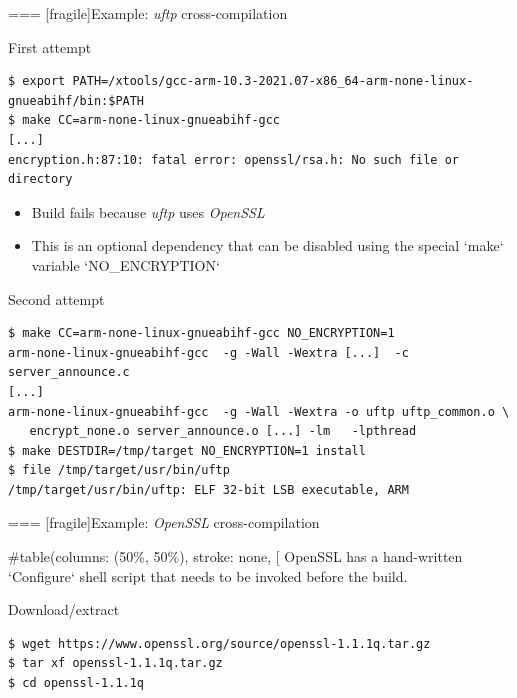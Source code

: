 === [fragile]{Example: {\em uftp} cross-compilation}
  \begin{block}{First attempt}
    {\scriptsize
\begin{verbatim}
$ export PATH=/xtools/gcc-arm-10.3-2021.07-x86_64-arm-none-linux-gnueabihf/bin:$PATH
$ make CC=arm-none-linux-gnueabihf-gcc
[...]
encryption.h:87:10: fatal error: openssl/rsa.h: No such file or directory
\end{verbatim}
    }
  \end{block}

  \begin{itemize}
  \item Build fails because {\em uftp} uses {\em OpenSSL}
  \item This is an optional dependency that can be disabled using the
    special `make` variable `NO_ENCRYPTION`
  \end{itemize}

  \begin{block}{Second attempt}
    {\scriptsize
\begin{verbatim}
$ make CC=arm-none-linux-gnueabihf-gcc NO_ENCRYPTION=1
arm-none-linux-gnueabihf-gcc  -g -Wall -Wextra [...]  -c server_announce.c
[...]
arm-none-linux-gnueabihf-gcc  -g -Wall -Wextra -o uftp uftp_common.o \
   encrypt_none.o server_announce.o [...] -lm   -lpthread
$ make DESTDIR=/tmp/target NO_ENCRYPTION=1 install
$ file /tmp/target/usr/bin/uftp
/tmp/target/usr/bin/uftp: ELF 32-bit LSB executable, ARM
\end{verbatim}
    }
  \end{block}


=== [fragile]{Example: {\em OpenSSL} cross-compilation}

  
#table(columns: (50\%, 50\%), stroke: none,
[
  OpenSSL has a hand-written `Configure` shell script that needs
  to be invoked before the build.

  \begin{block}{Download/extract}
    {\tiny
\begin{verbatim}
$ wget https://www.openssl.org/source/openssl-1.1.1q.tar.gz
$ tar xf openssl-1.1.1q.tar.gz
$ cd openssl-1.1.1q
\end{verbatim}
    }
  \end{block}

